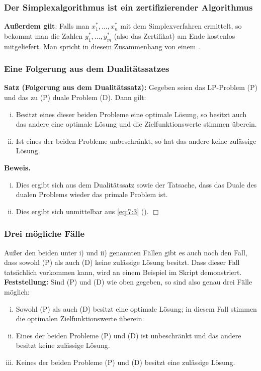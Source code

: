 \documentclass[smaller]{beamer}
\begin{document}
\begin{frame}
\frametitle{Der Simplexalgorithmus ist ein zertifizierender Algorithmus}
 \textbf{Außerdem gilt}: \alert{Falls man $x_1^*,\ldots,x_n^*$ mit dem Simplexverfahren ermittelt, so bekommt man die Zahlen $y_1^*,\ldots,y_m^*$ (also das Zertifikat) am Ende {\glqq}kostenlos mitgeliefert{\grqq}}. Man spricht in diesem Zusammenhang von einem .\label{page:7:5}
\end{frame}

\begin{frame}
 \frametitle{Eine Folgerung aus dem Dualitätssatzes}
 \textbf{Satz (Folgerung aus dem Dualitätssatz):}
Gegeben seien das LP-Problem (P) und das zu (P) duale Problem (D). Dann gilt:
\begin{enumerate}[i)]
\item Besitzt eines dieser beiden Probleme eine optimale Lösung, so besitzt auch das andere eine optimale Lösung und die Zielfunktionswerte stimmen überein.
\item Ist eines der beiden Probleme unbeschränkt, so hat das andere keine zulässige Lösung.
\end{enumerate}
\textbf{Beweis.} 
\begin{enumerate}[i)]
\item Dies ergibt sich aus dem Dualitätssatz sowie der Tatsache, dass das Duale des dualen Problems wieder das primale Problem ist.
\item Dies ergibt sich unmittelbar aus \eqref{eq:7:3} (). \qquad $\Box$
\end{enumerate}
\end{frame}

\begin{frame}
 \frametitle{Drei mögliche Fälle}
 Außer den beiden unter i) und ii) genannten Fällen gibt es auch noch den Fall, dass sowohl (P) als auch (D) keine zulässige Lösung besitzt. Dass dieser Fall tatsächlich vorkommen kann, wird an einem Beispiel im Skript demonstriert. \\ \vspace*{0.2cm}
 \textbf{Feststellung:}
Sind (P) und (D) wie oben gegeben, so sind also genau \alert{drei Fälle} möglich:
\begin{enumerate}[i)]
\item Sowohl (P) als auch (D) besitzt eine optimale Lösung; in diesem Fall stimmen die optimalen Zielfunktionswerte überein.
\item Eines der beiden Probleme (P) und (D) ist unbeschränkt und das andere besitzt keine zulässige Lösung.
\item Keines der beiden Probleme (P) und (D) besitzt eine zulässige Lösung.
\end{enumerate}
\end{frame}
\end{document}
